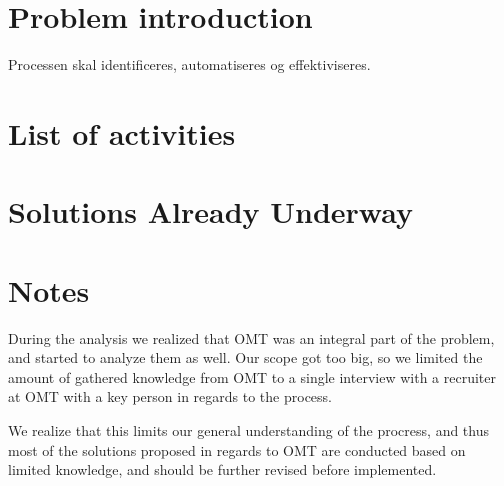 \section{Problem introduction}

Processen skal identificeres, automatiseres og effektiviseres.

\section{List of activities}


\section{Solutions Already Underway}


\section{Notes}
During the analysis we realized that OMT was an integral part of the problem, and started to analyze them as well. Our scope got too big, so we limited the amount of gathered knowledge from OMT to a single interview with a recruiter at OMT with a key person in regards to the process. 

We realize that this limits our general understanding of the procress, and thus most of the solutions proposed in regards to OMT are conducted based on limited knowledge, and should be further revised before implemented. 
